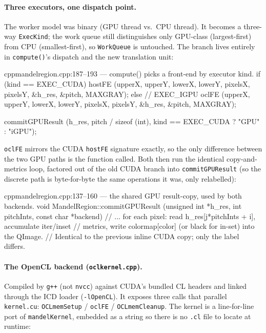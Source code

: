 \documentclass[
	english,
	letterpaper, oneside
]{article}
\begin{document}
\paragraph{Three executors, one dispatch point.} The worker model was binary
(GPU thread vs.\ CPU thread). It becomes a three-way \texttt{ExecKind}; the work
queue still distinguishes only GPU-class (largest-first) from CPU
(smallest-first), so \texttt{WorkQueue} is untouched. The branch lives entirely
in \texttt{compute()}'s dispatch and the new translation unit:

\begin{sourcecode}{cpp}{mandelregion.cpp:187--193 --- compute() picks a front-end by executor kind.}
if (kind == EXEC_CUDA)
  hostFE (upperX, upperY, lowerX, lowerY, pixelsX, pixelsY, &h_res, &pitch, MAXGRAY);
else                      // EXEC_IGPU
  oclFE  (upperX, upperY, lowerX, lowerY, pixelsX, pixelsY, &h_res, &pitch, MAXGRAY);

commitGPUResult (h_res, pitch / sizeof (int),
                 kind == EXEC_CUDA ? "GPU" : "iGPU");
\end{sourcecode}

\texttt{oclFE} mirrors the CUDA \texttt{hostFE} signature exactly, so the only
difference between the two GPU paths is the function called. Both then run the
identical copy-and-metrics loop, factored out of the old CUDA branch into
\texttt{commitGPUResult} (so the discrete path is byte-for-byte the same
operations it was, only relabelled):

\begin{sourcecode}{cpp}{mandelregion.cpp:137--160 --- the shared GPU result-copy, used by both backends.}
void MandelRegion::commitGPUResult (unsigned int *h_res, int pitchInts,
                                    const char *backend) {
  // ... for each pixel: read h_res[j*pitchInts + i], accumulate iter/inset
  //     metrics, write colormap[color] (or black for in-set) into the QImage.
  //     Identical to the previous inline CUDA copy; only the label differs.
}
\end{sourcecode}

\paragraph{The OpenCL backend (\texttt{oclkernel.cpp}).} Compiled by \texttt{g++}
(not \texttt{nvcc}) against CUDA's bundled CL headers and linked through the ICD
loader (\texttt{-lOpenCL}). It exposes three calls that parallel
\texttt{kernel.cu}: \texttt{OCLmemSetup} / \texttt{oclFE} / \texttt{OCLmemCleanup}.
The kernel is a line-for-line port of \texttt{mandelKernel}, embedded as a string
so there is no \texttt{.cl} file to locate at runtime:
\end{document}
